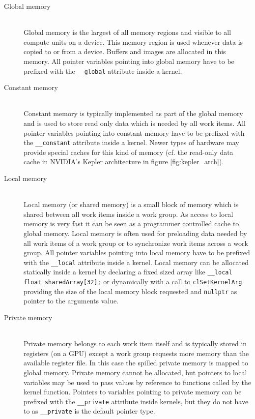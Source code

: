 \begin{description}
	\item[Global memory] \hfill \\
	Global memory is the largest of all memory regions and visible to all compute units on a device. This memory region is used whenever data is copied to or from a device. Buffers and images are allocated in this memory. All pointer variables pointing into global memory have to be prefixed with the \lstinline!__global! attribute inside a kernel. \cite[p.29]{opencl_book}
	
	\item[Constant memory] \hfill \\
	Constant memory is typically implemented as part of the global memory and is used to store read only data which is needed by all work items. All pointer variables pointing into constant memory have to be prefixed with the \lstinline!__constant! attribute inside a kernel. \cite[p.30]{opencl_book} Newer types of hardware may provide special caches for this kind of memory (cf. the read-only data cache in NVIDIA's Kepler architecture in figure \ref{fig:kepler_arch}).
	
	\item[Local memory] \hfill \\
	Local memory (or shared memory) is a small block of memory which is shared between all work items inside a work group. As access to local memory is very fast it can be seen as a programmer controlled cache to global memory. Local memory is often used for preloading data needed by all work items of a work group or to synchronize work items across a work group. All pointer variables pointing into local memory have to be prefixed with the \lstinline!__local! attribute inside a kernel. Local memory can be allocated statically inside a kernel by declaring a fixed sized array like \lstinline!__local float sharedArray[32];! or dynamically with a call to \lstinline!clSetKernelArg! providing the size of the local memory block requested and \lstinline!nullptr! as pointer to the arguments value. \cite[p.30]{opencl_book}

	\item[Private memory] \hfill \\
	Private memory belongs to each work item itself and is typically stored in registers (on a GPU) except a work group requests more memory than the available register file. In this case the spilled private memory is mapped to global memory. Private memory cannot be allocated, but pointers to local variables may be used to pass values by reference to functions called by the kernel function. Pointers to variables pointing to private memory can be prefixed with the \lstinline!__private! attribute inside kernels, but they do not have to as \lstinline!__private! is the default pointer type. \cite[p.30]{opencl_book}
\end{description}

